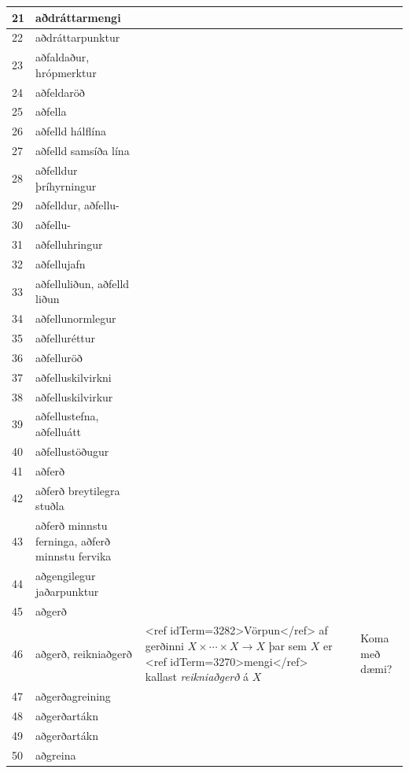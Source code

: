 \begin{longtable}{p{}|p{}|p{}|p{}|p{}}
\hline
21 & aðdráttarmengi &  &  &  \\
\hline
22 & aðdráttarpunktur &  &  &  \\
\hline
23 & aðfaldaður, hrópmerktur &  &  &  \\
\hline
24 & aðfeldaröð &  &  &  \\
\hline
25 & aðfella &  &  &  \\
\hline
26 & aðfelld hálflína &  &  &  \\
\hline
27 & aðfelld samsíða lína &  &  &  \\
\hline
28 & aðfelldur þríhyrningur &  &  &  \\
\hline
29 & aðfelldur, aðfellu- &  &  &  \\
\hline
30 & aðfellu- &  &  &  \\
\hline
31 & aðfelluhringur &  &  &  \\
\hline
32 & aðfellujafn &  &  &  \\
\hline
33 & aðfelluliðun, aðfelld liðun &  &  &  \\
\hline
34 & aðfellunormlegur &  &  &  \\
\hline
35 & aðfelluréttur &  &  &  \\
\hline
36 & aðfelluröð &  &  &  \\
\hline
37 & aðfelluskilvirkni &  &  &  \\
\hline
38 & aðfelluskilvirkur &  &  &  \\
\hline
39 & aðfellustefna, aðfelluátt &  &  &  \\
\hline
40 & aðfellustöðugur &  &  &  \\
\hline
41 & aðferð &  &  &  \\
\hline
42 & aðferð breytilegra stuðla &  &  &  \\
\hline
43 & aðferð minnstu ferninga, aðferð minnstu fervika &  &  &  \\
\hline
44 & aðgengilegur jaðarpunktur &  &  &  \\
\hline
45 & aðgerð &  &  &  \\
\hline
46 & aðgerð, reikniaðgerð & <ref idTerm=3282>Vörpun</ref> af gerðinni $X \times \cdots \times X \to X$ þar sem $X$ er <ref idTerm=3270>mengi</ref> kallast \textit{reikniaðgerð} á $X$ & & Koma með dæmi? \\
\hline
47 & aðgerðagreining &  &  &  \\
\hline
48 & aðgerðartákn &  &  &  \\
\hline
49 & aðgerðartákn &  &  &  \\
\hline
50 & aðgreina &  &  &  \\

\end{longtable}
